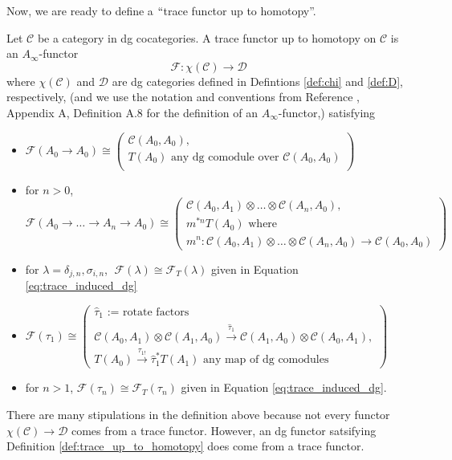 %
Now, we are ready to define a $``$trace functor up 
to homotopy''.
%
\begin{defn} \label{def:trace_up_to_homotopy}
Let $\mathcal{C}$ be a category in dg 
cocategories. A trace functor up to homotopy on 
$\mathcal{C}$ is an $A_\infty$-functor 
$$\mathcal{F}: \chi(\mathcal{C}) \to \mathcal{D}$$
where $\chi(\mathcal{C})$ and $\mathcal{D}$ are 
dg categories defined in Defintions \ref{def:chi} 
and \ref{def:D}, respectively, (and we use the 
notation and conventions from Reference \cite{F}, 
Appendix A, Definition A.8 for the definition of an 
$A_\infty$-functor,) satisfying
\begin{itemize}
	\item $\mathcal{F}(A_0 \to A_0) \cong 
	\begin{pmatrix}
		\mathcal{C}(A_0,A_0),\\
		T(A_0) \textrm{ any dg comodule over }\mathcal{C}(A_0,A_0)\\
	\end{pmatrix}$
	\item for $n>0$,$$\mathcal{F}
	(A_0 \to \dots \to A_n \to A_0) \cong	
	\begin{pmatrix}
		\mathcal{C}(A_0,A_1) \otimes \dots \otimes \mathcal{C}(A_n,A_0),\\
		m^{*n} T(A_0) \textrm{ where }\\
		m^n: \mathcal{C}(A_0,A_1) \otimes \dots \otimes \mathcal{C}(A_n,A_0) \to \mathcal{C}(A_0,A_0)
	\end{pmatrix}$$
	\item for $\lambda = \delta_{j,n}, \sigma_{i,n}$,  
	$\; \mathcal{F}(\lambda) \cong 
	\mathcal{F}_T(\lambda)$ given in Equation \ref{eq:trace_induced_dg}
	\item $\mathcal{F}(\tau_1) \cong 
	\begin{pmatrix}
		\textrm{$\hat{\tau}_1$ := rotate factors}\\
		\mathcal{C}(A_0,A_1) \otimes \mathcal{C}(A_1,A_0)
		\xrightarrow{\hat{\tau}_1}
		\mathcal{C}(A_1,A_0) \otimes \mathcal{C}(A_0,A_1),\\
		T(A_0)
		\xrightarrow{\tau_{1!}}
		\hat{\tau}_1^* T(A_1) \textrm{ any map of dg comodules}
	\end{pmatrix}$
	\item for $n>1$, $\mathcal{F}(\tau_n) \cong 
	\mathcal{F}_T(\tau_n)$ given in Equation \ref{eq:trace_induced_dg}.
\end{itemize}
\end{defn}
There are many stipulations in the definition above 
because not every functor $\chi(\mathcal{C}) \to \mathcal{D}$
comes from a trace functor. However, an dg functor 
satsifying Definition \ref{def:trace_up_to_homotopy} 
does come from a trace functor.















